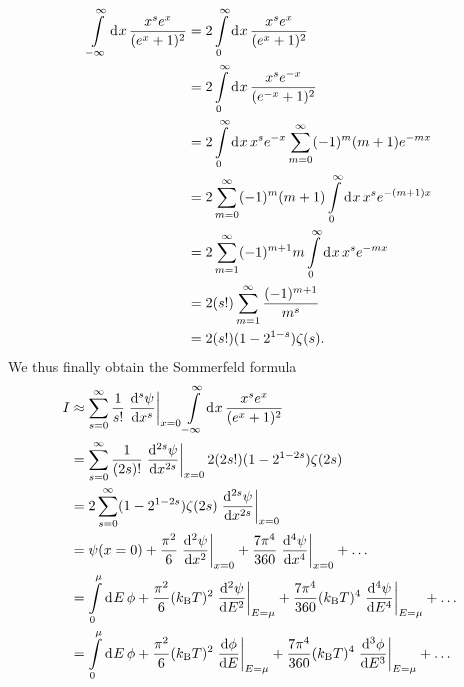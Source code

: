 \begin{align*}
	\int\limits_{-\infty}^{\infty}\dd[]{x}\frac{x^{s}e^{x}}{(e^{x} + 1)^{2}} &= 2\int\limits_{0}^{\infty}\dd[]{x}\frac{x^{s}e^{x}}{(e^{x} + 1)^{2}} \\
	                                                               &= 2\int\limits_{0}^{\infty}\dd[]{x}\frac{x^{s}e^{-x}}{(e^{-x} + 1)^{2}} \\
	                                                               &= 2\int\limits_{0}^{\infty}\dd[]{x}x^{s}e^{-x}\sum\limits_{m = 0}^{\infty}(-1)^{m}(m + 1)e^{-mx} \\
	                                                               &= 2\sum\limits_{m = 0}^{\infty}(-1)^{m}(m + 1)\int\limits_{0}^{\infty}\dd[]{x}x^{s}e^{-(m + 1)x} \\
	                                                               &= 2\sum\limits_{m = 1}^{\infty}(-1)^{m + 1}m\int\limits_{0}^{\infty}\dd[]{x}x^{s}e^{-mx} \\
	                                                               &= 2(s!)\sum\limits_{m = 1}^{\infty}\frac{(-1)^{m + 1}}{m^{s}} \\
	                                                               &= 2(s!)(1 - 2^{1 - s})\zeta(s).
\end{align*}
We thus finally obtain the Sommerfeld formula
\begin{align*}
	I &\approx \sum\limits_{s = 0}^{\infty}\frac{1}{s!}\eval{\dv[s]{\psi}{x}}_{x = 0}\integ{-\infty}{\infty}{x}{\frac{x^{s}e^{x}}{(e^{x} + 1)^{2}}} \\
	  &= \sum\limits_{s = 0}^{\infty}\frac{1}{(2s)!}\eval{\dv[2s]{\psi}{x}}_{x = 0}2(2s!)(1 - 2^{1 - 2s})\zeta(2s) \\
	  &= 2\sum\limits_{s = 0}^{\infty}(1 - 2^{1 - 2s})\zeta(2s)\eval{\dv[2s]{\psi}{x}}_{x = 0} \\
	  &= \psi(x = 0) + \frac{\pi^{2}}{6}\eval{\dv[2]{\psi}{x}}_{x = 0} + \frac{7\pi^{4}}{360}\eval{\dv[4]{\psi}{x}}_{x = 0} + \dots \\
	  &= \integ{0}{\mu}{E}{\phi} + \frac{\pi^{2}}{6}(\kb T)^{2}\eval{\dv[2]{\psi}{E}}_{E = \mu} + \frac{7\pi^{4}}{360}(\kb T)^{4}\eval{\dv[4]{\psi}{E}}_{E = \mu} + \dots \\
	  &= \integ{0}{\mu}{E}{\phi} + \frac{\pi^{2}}{6}(\kb T)^{2}\eval{\dv{\phi}{E}}_{E = \mu} + \frac{7\pi^{4}}{360}(\kb T)^{4}\eval{\dv[3]{\phi}{E}}_{E = \mu} + \dots
\end{align*}

